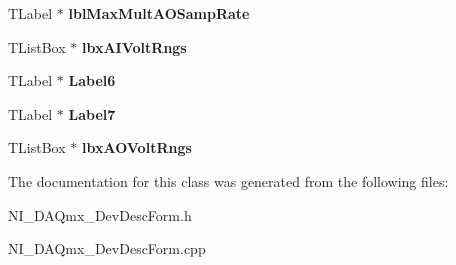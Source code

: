 \begin{DoxyCompactItemize}
\item 
\hypertarget{class_t_device_desc_a104e950e4ecf1046623a6c0ee7fe3ee1}{T\+Label $\ast$ {\bfseries lbl\+Max\+Mult\+A\+O\+Samp\+Rate}}\label{class_t_device_desc_a104e950e4ecf1046623a6c0ee7fe3ee1}

\item 
\hypertarget{class_t_device_desc_a6b7d4dc4926dcd7a74035dffbc286b1f}{T\+List\+Box $\ast$ {\bfseries lbx\+A\+I\+Volt\+Rngs}}\label{class_t_device_desc_a6b7d4dc4926dcd7a74035dffbc286b1f}

\item 
\hypertarget{class_t_device_desc_a53685db953c82e6bce8d0274d8ab4337}{T\+Label $\ast$ {\bfseries Label6}}\label{class_t_device_desc_a53685db953c82e6bce8d0274d8ab4337}

\item 
\hypertarget{class_t_device_desc_a4c812bd7343e237d18b8d762878c131a}{T\+Label $\ast$ {\bfseries Label7}}\label{class_t_device_desc_a4c812bd7343e237d18b8d762878c131a}

\item 
\hypertarget{class_t_device_desc_a562dc3265cded6febc4d523b0b70318d}{T\+List\+Box $\ast$ {\bfseries lbx\+A\+O\+Volt\+Rngs}}\label{class_t_device_desc_a562dc3265cded6febc4d523b0b70318d}

\end{DoxyCompactItemize}


The documentation for this class was generated from the following files\+:\begin{DoxyCompactItemize}
\item 
N\+I\+\_\+\+D\+A\+Qmx\+\_\+\+Dev\+Desc\+Form.\+h\item 
N\+I\+\_\+\+D\+A\+Qmx\+\_\+\+Dev\+Desc\+Form.\+cpp\end{DoxyCompactItemize}
